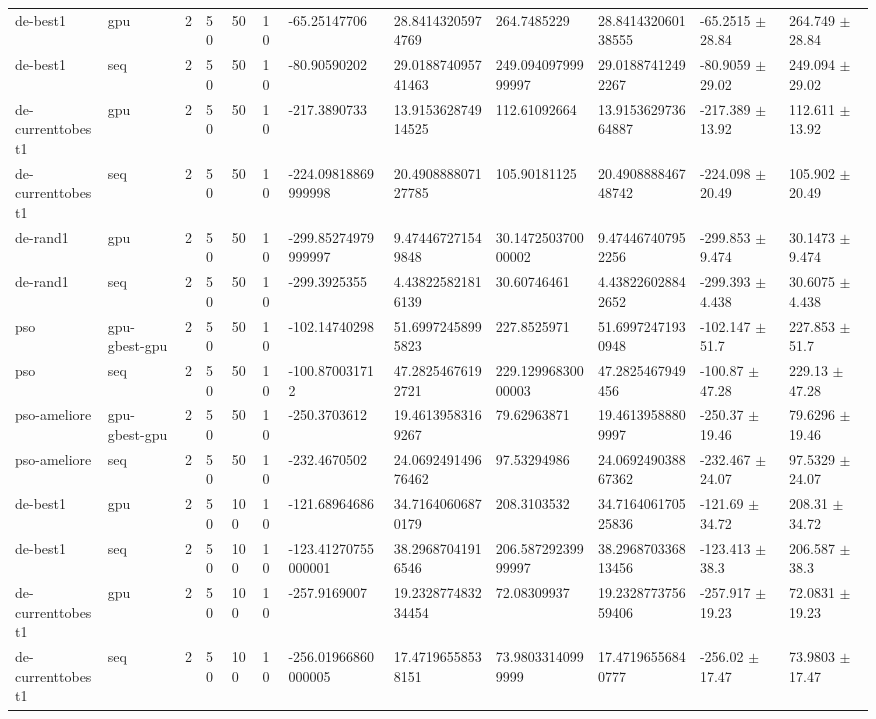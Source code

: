 \begin{table}[t]
\begin{tabular}{llllllllllll}
de-best1 & gpu & 2 & 50 & 50 & 10 & -65.25147706 & 28.84143205974769 & 264.7485229 & 28.841432060138555 & -65.2515 $\pm$ 28.84 & 264.749 $\pm$ 28.84 \\
de-best1 & seq & 2 & 50 & 50 & 10 & -80.90590202 & 29.018874095741463 & 249.09409799999997 & 29.01887412492267 & -80.9059 $\pm$ 29.02 & 249.094 $\pm$ 29.02 \\
de-currenttobest1 & gpu & 2 & 50 & 50 & 10 & -217.3890733 & 13.915362874914525 & 112.61092664 & 13.915362973664887 & -217.389 $\pm$ 13.92 & 112.611 $\pm$ 13.92 \\
de-currenttobest1 & seq & 2 & 50 & 50 & 10 & -224.09818869999998 & 20.490888807127785 & 105.90181125 & 20.490888846748742 & -224.098 $\pm$ 20.49 & 105.902 $\pm$ 20.49 \\
de-rand1 & gpu & 2 & 50 & 50 & 10 & -299.85274979999997 & 9.474467271549848 & 30.147250370000002 & 9.474467407952256 & -299.853 $\pm$ 9.474 & 30.1473 $\pm$ 9.474 \\
de-rand1 & seq & 2 & 50 & 50 & 10 & -299.3925355 & 4.438225821816139 & 30.60746461 & 4.438226028842652 & -299.393 $\pm$ 4.438 & 30.6075 $\pm$ 4.438 \\
pso & gpu-gbest-gpu & 2 & 50 & 50 & 10 & -102.14740298 & 51.69972458995823 & 227.8525971 & 51.69972471930948 & -102.147 $\pm$ 51.7 & 227.853 $\pm$ 51.7 \\
pso & seq & 2 & 50 & 50 & 10 & -100.870031712 & 47.28254676192721 & 229.12996830000003 & 47.2825467949456 & -100.87 $\pm$ 47.28 & 229.13 $\pm$ 47.28 \\
pso-ameliore & gpu-gbest-gpu & 2 & 50 & 50 & 10 & -250.3703612 & 19.46139583169267 & 79.62963871 & 19.46139588809997 & -250.37 $\pm$ 19.46 & 79.6296 $\pm$ 19.46 \\
pso-ameliore & seq & 2 & 50 & 50 & 10 & -232.4670502 & 24.069249149676462 & 97.53294986 & 24.069249038867362 & -232.467 $\pm$ 24.07 & 97.5329 $\pm$ 24.07 \\
de-best1 & gpu & 2 & 50 & 100 & 10 & -121.68964686 & 34.71640606870179 & 208.3103532 & 34.716406170525836 & -121.69 $\pm$ 34.72 & 208.31 $\pm$ 34.72 \\
de-best1 & seq & 2 & 50 & 100 & 10 & -123.41270755000001 & 38.29687041916546 & 206.58729239999997 & 38.296870336813456 & -123.413 $\pm$ 38.3 & 206.587 $\pm$ 38.3 \\
de-currenttobest1 & gpu & 2 & 50 & 100 & 10 & -257.9169007 & 19.232877483234454 & 72.08309937 & 19.232877375659406 & -257.917 $\pm$ 19.23 & 72.0831 $\pm$ 19.23 \\
de-currenttobest1 & seq & 2 & 50 & 100 & 10 & -256.01966860000005 & 17.47196558538151 & 73.98033140999999 & 17.47196556840777 & -256.02 $\pm$ 17.47 & 73.9803 $\pm$ 17.47 \\

\end{tabular}
\end{table}
